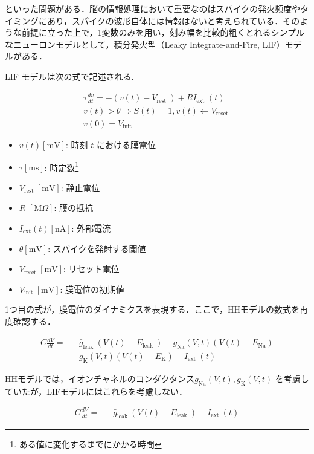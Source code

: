 \documentclass[dvipdfmx, A4j, twocolumn, 10.5pt]{jsarticle}
\begin{document}
といった問題がある．脳の情報処理において重要なのはスパイクの発火頻度やタイミングにあり，スパイクの波形自体には情報はないと考えられている．そのような前提に立った上で，1変数のみを用い，刻み幅を比較的粗くとれるシンプルなニューロンモデルとして，積分発火型（Leaky Integrate-and-Fire, LIF）モデルがある．

LIF モデルは次の式で記述される.

$$
\begin{gathered}
\tau \frac{d v}{d t}=-\left(v(t)-V_{\text {rest }}\right)+R I_{\text {ext }}(t) \\
v(t)>\theta \Rightarrow S(t)=1, v(t) \leftarrow V_{\text {reset }} \\
v(0)=V_{\text {init }}
\end{gathered}
$$

 \begin{itemize}
    \item $v(t)[\mathrm{mV}]$: 時刻 $t$ における膜電位
    \item $\tau[\mathrm{ms}]$: 時定数\footnote{ある値に変化するまでにかかる時間}
    \item $V_{\text {rest }}[\mathrm{mV}]$: 静止電位
    \item $R$ $[\mathrm{M} \Omega]$: 膜の抵抗
    \item $I_{\mathrm{ext}}(t)[\mathrm{nA}]$: 外部電流
    \item $\theta[\mathrm{mV}]$: スパイクを発射する閾値
    \item $V_{\text {reset }}[\mathrm{mV}]$: リセット電位
    \item $V_{\text {init }}[\mathrm{mV}]$: 膜電位の初期値
 \end{itemize}



1つ目の式が，膜電位のダイナミクスを表現する．ここで，HHモデルの数式を再度確認する．

$$
\begin{aligned}
C \frac{d V}{d t}= & -\bar{g}_{\text {leak }}\left(V(t)-E_{\text {leak }}\right)-g_{\mathrm{Na}}(V, t)\left(V(t)-E_{\mathrm{Na}}\right) \\
&  -g_{\mathrm{K}}(V, t)\left(V(t)-E_{\mathrm{K}}\right) +I_{\text {ext }}(t)
\end{aligned}
$$

HHモデルでは，イオンチャネルのコンダクタンス$g_{\mathrm{Na}}(V, t), g_{\mathrm{K}}(V, t)$ を考慮していたが，LIFモデルにはこれらを考慮しない．

$$
\begin{aligned}
C \frac{d V}{d t}= & -\bar{g}_{\text {leak }}\left(V(t)-E_{\text {leak }}\right) +I_{\text {ext }}(t)
\end{aligned}
$$
\end{document}
